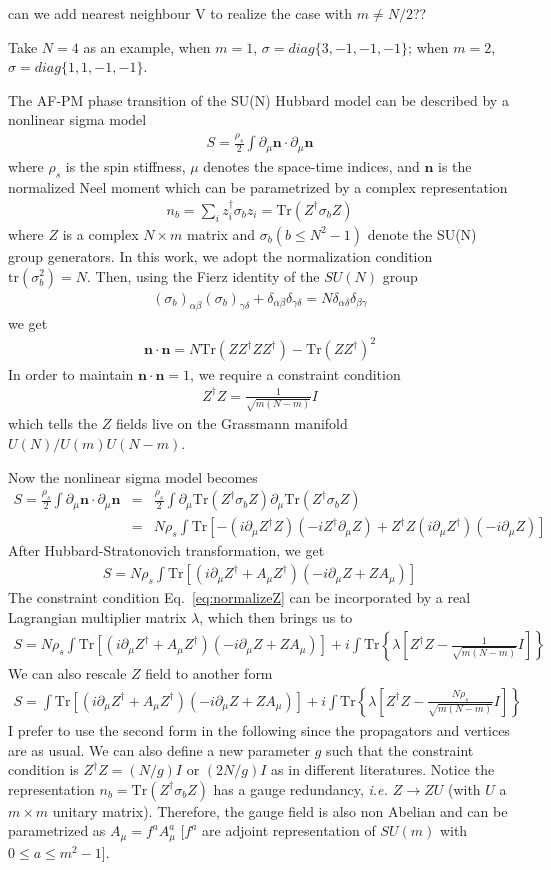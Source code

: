 \documentclass[aps,preprint,superscriptaddress]{revtex4-1}
\newcommand{\bea}{\begin{eqnarray}}
\newcommand{\eea}{\end{eqnarray}}
\newcommand{\bn}{\mathbf{n}}
\newcommand{\ie}{\textit{i.e.{ }}}
\begin{document}
{\color{red}can we add nearest neighbour V to realize the case with $m\ne N/2$??}

Take $N=4$ as an example, when $m=1$, $\sigma=diag\{3,-1,-1,-1\}$; when $m=2$, $\sigma=diag\{1,1,-1,-1\}$. 

The AF-PM phase transition of the SU(N) Hubbard model can be described by a nonlinear sigma model
\bea S=\frac{\rho_s}{2}\int \partial_\mu\bn \cdot \partial_\mu\bn \eea
where $\rho_s$ is the spin stiffness, $\mu$ denotes the space-time indices, and $\bn$ is the normalized Neel moment which can be parametrized by a complex representation \bea n_b=\sum_i z_i^\dag \sigma_b z_i=\mathrm{Tr}(Z^\dag\sigma_b Z) \eea  where $Z$ is a complex $N\times m$ matrix and $\sigma_b (b\le N^2-1)$ denote the SU(N) group generators. In this work, we adopt the normalization condition $\mathrm{tr}(\sigma_b^2)=N$. Then, using the Fierz identity of the $SU(N)$ group
\bea (\sigma_b)_{\alpha\beta} (\sigma_b)_{\gamma\delta}+\delta_{\alpha\beta}\delta_{\gamma\delta}=N\delta_{\alpha\delta}\delta_{\beta\gamma} \eea
we get
\bea \bn\cdot\bn = N\mathrm{Tr}(ZZ^\dag Z Z^\dag)-\mathrm{Tr}(ZZ^\dag)^2 \eea
In order to maintain $\bn\cdot\bn=1$, we require a constraint condition \bea Z^\dag Z=\frac{1}{\sqrt{m(N-m)}}I \label{eq:normalizeZ}\eea
which tells the $Z$ fields live on the Grassmann manifold $U(N)/U(m)U(N-m)$. 

Now the nonlinear sigma model becomes
\bea S=\frac{\rho_s}{2}\int\partial_\mu\bn \cdot \partial_\mu\bn&=&\frac{\rho_s}{2}\int\partial_\mu \mathrm{Tr}(Z^\dagger\sigma_b Z) \partial_\mu \mathrm{Tr}(Z^\dagger \sigma_b Z) \nonumber\\
&=& N\rho_s \int\mathrm{Tr}\left[-(i\partial_\mu Z^\dagger Z) (-iZ^\dag \partial_\mu Z) + Z^\dag Z (i\partial_\mu Z^\dagger)(-i\partial_\mu Z)\right] \eea 
After Hubbard-Stratonovich transformation, we get
\bea S=N\rho_s\int \mathrm{Tr}\left[ (i\partial_\mu Z^\dag+A_\mu Z^\dag)(-i\partial_\mu Z+ZA_\mu)  \right] \eea
The constraint condition Eq.~\eqref{eq:normalizeZ} can be incorporated by a real Lagrangian multiplier matrix $\lambda$, which then brings us to
\bea \boxed{ S=N\rho_s\int \mathrm{Tr}\left[ (i\partial_\mu Z^\dag+A_\mu Z^\dag)(-i\partial_\mu Z+ZA_\mu)  \right] + i\int\mathrm{Tr}\left\{\lambda\left[Z^\dag Z-\frac{1}{\sqrt{m(N-m)}}I\right]\right\} } \eea
We can also rescale $Z$ field to another form
\bea \boxed{ S=\int \mathrm{Tr}\left[ (i\partial_\mu Z^\dag+A_\mu Z^\dag)(-i\partial_\mu Z+ZA_\mu)  \right] + i\int\mathrm{Tr}\left\{\lambda\left[Z^\dag Z-\frac{N\rho_s}{\sqrt{m(N-m)}}I\right]\right\} } \eea
{\color{red} I prefer to use the second form in the following since the propagators and vertices are as usual. We can also define a new parameter $g$ such that the constraint condition is $Z^\dag Z=(N/g)I$ or $(2N/g)I$ as in different literatures.} Notice the representation $n_b=\mathrm{Tr}(Z^\dag \sigma_b Z)$ has a gauge redundancy, \ie $Z\rightarrow ZU$ (with $U$ a $m\times m$ unitary matrix). Therefore, the gauge field is also non Abelian and can be parametrized as $A_\mu=f^aA_\mu^a$ [$f^a$ are adjoint representation of $SU(m)$ with $0\le a\le m^2-1$].
\end{document}
